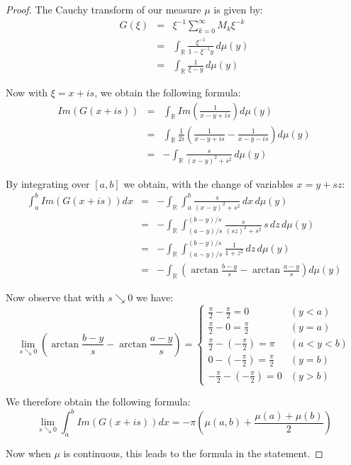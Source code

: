 \documentclass[12pt]{amsbook}
\begin{document}
\begin{proof}
The Cauchy transform of our measure $\mu$ is given by:
\begin{eqnarray*}
G(\xi)
&=&\xi^{-1}\sum_{k=0}^\infty M_k\xi^{-k}\\\
&=&\int_\mathbb R\frac{\xi^{-1}}{1-\xi^{-1}y}\,d\mu(y)\\
&=&\int_\mathbb R\frac{1}{\xi-y}\,d\mu(y)
\end{eqnarray*}

Now with $\xi=x+is$, we obtain the following formula:
\begin{eqnarray*}
Im(G(x+is))
&=&\int_\mathbb RIm\left(\frac{1}{x-y+is}\right)d\mu(y)\\
&=&\int_\mathbb R\frac{1}{2i}\left(\frac{1}{x-y+is}-\frac{1}{x-y-is}\right)d\mu(y)\\
&=&-\int_\mathbb R\frac{s}{(x-y)^2+s^2}\,d\mu(y)
\end{eqnarray*}

By integrating over $[a,b]$ we obtain, with the change of variables $x=y+sz$:
\begin{eqnarray*}
\int_a^bIm(G(x+is))dx
&=&-\int_\mathbb R\int_a^b\frac{s}{(x-y)^2+s^2}\,dx\,d\mu(y)\\
&=&-\int_\mathbb R\int_{(a-y)/s}^{(b-y)/s}\frac{s}{(sz)^2+s^2}\,s\,dz\,d\mu(y)\\
&=&-\int_\mathbb R\int_{(a-y)/s}^{(b-y)/s}\frac{1}{1+z^2}\,dz\,d\mu(y)\\
&=&-\int_\mathbb R\left(\arctan\frac{b-y}{s}-\arctan\frac{a-y}{s}\right)d\mu(y)
\end{eqnarray*}

Now observe that with $s\searrow0$ we have:
$$\lim_{s\searrow0}\left(\arctan\frac{b-y}{s}-\arctan\frac{a-y}{s}\right)
=\begin{cases}
\frac{\pi}{2}-\frac{\pi}{2}=0& (y<a)\\
\frac{\pi}{2}-0=\frac{\pi}{2}& (y=a)\\
\frac{\pi}{2}-(-\frac{\pi}{2})=\pi& (a<y<b)\\
0-(-\frac{\pi}{2})=\frac{\pi}{2}& (y=b)\\
-\frac{\pi}{2}-(-\frac{\pi}{2})=0& (y>b)
\end{cases}$$

We therefore obtain the following formula:
$$\lim_{s\searrow0}\int_a^bIm(G(x+is))dx=-\pi\left(\mu(a,b)+\frac{\mu(a)+\mu(b)}{2}\right)$$

Now when $\mu$ is continuous, this leads to the formula in the statement.
\end{proof}
\end{document}
